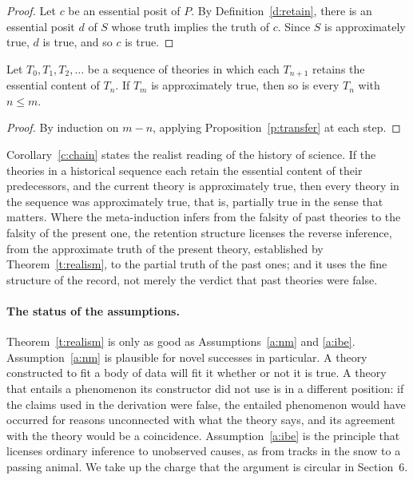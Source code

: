 \documentclass{situationist-preprint}
\begin{document}
\begin{proof}
Let $c$ be an essential posit of $P$. By Definition~\ref{d:retain}, there is an essential posit $d$ of $S$ whose truth implies the truth of $c$. Since $S$ is approximately true, $d$ is true, and so $c$ is true.
\end{proof}

\begin{corollary}\label{c:chain}
Let $T_0, T_1, T_2, \ldots$ be a sequence of theories in which each $T_{n+1}$ retains the essential content of $T_n$. If $T_m$ is approximately true, then so is every $T_n$ with $n \le m$.
\end{corollary}

\begin{proof}
By induction on $m - n$, applying Proposition~\ref{p:transfer} at each step.
\end{proof}

Corollary~\ref{c:chain} states the realist reading of the history of science. If the theories in a historical sequence each retain the essential content of their predecessors, and the current theory is approximately true, then every theory in the sequence was approximately true, that is, partially true in the sense that matters. Where the meta-induction infers from the falsity of past theories to the falsity of the present one, the retention structure licenses the reverse inference, from the approximate truth of the present theory, established by Theorem~\ref{t:realism}, to the partial truth of the past ones; and it uses the fine structure of the record, not merely the verdict that past theories were false.

\paragraph{The status of the assumptions.} Theorem~\ref{t:realism} is only as good as Assumptions~\ref{a:nm} and \ref{a:ibe}. Assumption~\ref{a:nm} is plausible for novel successes in particular. A theory constructed to fit a body of data will fit it whether or not it is true. A theory that entails a phenomenon its constructor did not use is in a different position: if the claims used in the derivation were false, the entailed phenomenon would have occurred for reasons unconnected with what the theory says, and its agreement with the theory would be a coincidence. Assumption~\ref{a:ibe} is the principle that licenses ordinary inference to unobserved causes, as from tracks in the snow to a passing animal. We take up the charge that the argument is circular in Section~6.
\end{document}
